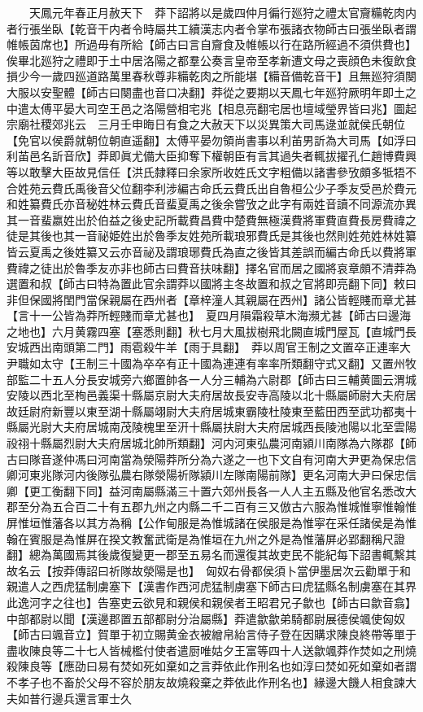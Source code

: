 　　天鳳元年春正月赦天下　莽下詔將以是歲四仲月徧行廵狩之禮太官齎糒乾肉内者行張坐臥【乾音干内者令時屬共工續漢志内者令掌布張諸衣物師古曰張坐臥者謂帷帳茵席也】所過毋有所給【師古曰言自齎食及帷帳以行在路所經過不須供費也】俟畢北廵狩之禮即于土中居洛陽之都羣公奏言皇帝至孝新遭文母之喪顔色未復飲食損少今一歲四廵道路萬里春秋尊非糒乾肉之所能堪【糒音備乾音干】且無廵狩須闋大服以安聖體【師古曰闋盡也音口决翻】莽從之要期以天鳳七年廵狩厥明年即土之中遣太傅平晏大司空王邑之洛陽營相宅兆【相息亮翻宅居也壇域瑩界皆曰兆】圖起宗廟社稷郊兆云　三月壬申晦日有食之大赦天下以災異策大司馬逯並就侯氏朝位【免官以侯爵就朝位朝直遥翻】太傅平晏勿領尚書事以利苖男訢為大司馬【如浮曰利苖邑名訢音欣】莽即眞尤備大臣抑奪下權朝臣有言其過失者輒拔擢孔仁趙博費興等以敢擊大臣故見信任【洪氏隸釋曰余家所收姓氏文字粗備以諸書參攷頗多牴牾不合姓苑云費氏禹後音父位翻李利涉編古命氏云費氏出自魯桓公少子季友受邑於費元和姓纂費氏亦音秘姓林云費氏音蜚夏禹之後余嘗攷之此字有兩姓音讀不同源流亦異其一音蜚嬴姓出於伯益之後史記所載費昌費中楚費無極漢費將軍費直費長房費禕之徒是其後也其一音祕姫姓出於魯季友姓苑所載琅邪費氏是其後也然則姓苑姓林姓纂皆云夏禹之後姓纂又云亦音祕及謂琅琊費氏為直之後皆其差誤而編古命氏以費將軍費禕之徒出於魯季友亦非也師古曰費音扶味翻】擇名官而居之國將哀章頗不清莽為選置和叔【師古曰特為置此官余謂莽以國將主冬故置和叔之官將即亮翻下同】敕曰非但保國將閨門當保親屬在西州者【章梓潼人其親屬在西州】諸公皆輕賤而章尤甚【言十一公皆為莽所輕賤而章尤甚也】　夏四月隕霜殺草木海瀕尤甚【師古曰邊海之地也】六月黄霧四塞【塞悉則翻】秋七月大風拔樹飛北闕直城門屋瓦【直城門長安城西出南頭第二門】雨雹殺牛羊【雨于具翻】　莽以周官王制之文置卒正連率大尹職如太守【王制三十國為卒卒有正十國為連連有率率所類翻守式又翻】又置州牧部監二十五人分長安城旁六鄉置帥各一人分三輔為六尉郡【師古曰三輔黄圖云渭城安陵以西北至栒邑義渠十縣屬京尉大夫府居故長安寺高陵以北十縣屬師尉大夫府居故廷尉府新豐以東至湖十縣屬翊尉大夫府居城東霸陵杜陵東至藍田西至武功都夷十縣屬光尉大夫府居城南茂陵槐里至汧十縣屬扶尉大夫府居城西長陵池陽以北至雲陽祋祤十縣屬烈尉大夫府居城北帥所類翻】河内河東弘農河南潁川南隊為六隊郡【師古曰隊音遂仲馮曰河南當為滎陽莽所分為六遂之一也下文自有河南大尹更為保忠信卿河東兆隊河内後隊弘農右隊滎陽祈隊潁川左隊南陽前隊】更名河南大尹曰保忠信卿【更工衡翻下同】益河南屬縣滿三十置六郊州長各一人人主五縣及他官名悉改大郡至分為五合百二十有五郡九州之内縣二千二百有三又倣古六服為惟城惟寧惟翰惟屏惟垣惟藩各以其方為稱【公作甸服是為惟城諸在侯服是為惟寜在采任諸侯是為惟翰在賓服是為惟屏在揆文教奮武衛是為惟垣在九州之外是為惟藩屏必郢翻稱尺證翻】總為萬國焉其後歲復變更一郡至五易名而還復其故吏民不能紀每下詔書輒繫其故名云【按莽傳詔曰祈隊故滎陽是也】　匈奴右骨都侯須卜當伊墨居次云勸單于和親遣人之西虎猛制虜塞下【漢書作西河虎猛制虜塞下師古曰虎猛縣名制虜塞在其界此逸河字之往也】告塞吏云欲見和親侯和親侯者王昭君兄子歙也【師古曰歙音翕】中部都尉以聞【漢邊郡置五部都尉分治屬縣】莽遣歙歙弟騎都尉展德侯颯使匈奴【師古曰颯音立】賀單于初立賜黄金衣被繒帛紿言侍子登在因購求陳良終帶等單于盡收陳良等二十七人皆械檻付使者遣厨唯姑夕王富等四十人送歙颯莽作焚如之刑燒殺陳良等【應劭曰易有焚如死如棄如之言莽依此作刑名也如淳曰焚如死如棄如者謂不孝子也不畜於父母不容於朋友故燒殺棄之莽依此作刑名也】緣邊大饑人相食諫大夫如普行邊兵還言軍士久

